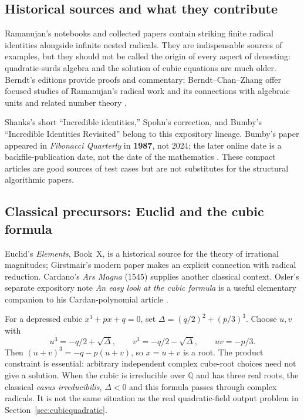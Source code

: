 \documentclass[11pt,letterpaper]{article}
\numberwithin{equation}{section}
\theoremstyle{definition}
\theoremstyle{remark}
\newcommand{\Q}{\mathbb{Q}}
\begin{document}
\subsection{Historical sources and what they contribute}
Ramanujan's notebooks and collected papers contain striking finite radical identities alongside infinite nested radicals. They are indispensable sources of examples, but they should not be called the origin of every aspect of denesting: quadratic-surds algebra and the solution of cubic equations are much older. Berndt's editions provide proofs and commentary; Berndt--Chan--Zhang offer focused studies of Ramanujan's radical work and its connections with algebraic units and related number theory \cite{ramanujan,berndt,berndt97,berndt98}.

Shanks's short ``Incredible identities,'' Spohn's correction, and Bumby's ``Incredible Identities Revisited'' belong to this expository lineage. Bumby's paper appeared in \emph{Fibonacci Quarterly} in \textbf{1987}, not 2024; the later online date is a backfile-publication date, not the date of the mathematics \cite{shanks,spohn,bumby}. These compact articles are good sources of test cases but are not substitutes for the structural algorithmic papers.

\subsection{Classical precursors: Euclid and the cubic formula}
Euclid's \emph{Elements}, Book~X, is a historical source for the theory of irrational magnitudes; Girstmair's modern paper makes an explicit connection with radical reduction. Cardano's \emph{Ars Magna} (1545) supplies another classical context. Osler's separate expository note \emph{An easy look at the cubic formula} is a useful elementary companion to his Cardan-polynomial article \cite{girstmair,oslercubic,osler}.

For a depressed cubic $x^3+px+q=0$, set $\Delta=(q/2)^2+(p/3)^3$. Choose $u,v$ with
\[
u^3=-q/2+\sqrt\Delta,\qquad
v^3=-q/2-\sqrt\Delta,\qquad uv=-p/3.
\]
Then $(u+v)^3=-q-p(u+v)$, so $x=u+v$ is a root. The product constraint is essential: arbitrary independent complex cube-root choices need not give a solution. When the cubic is irreducible over $\Q$ and has three real roots, the classical \emph{casus irreducibilis}, $\Delta<0$ and this formula passes through complex radicals. It is not the same situation as the real quadratic-field output problem in Section~\ref{sec:cubicquadratic}.
\end{document}
